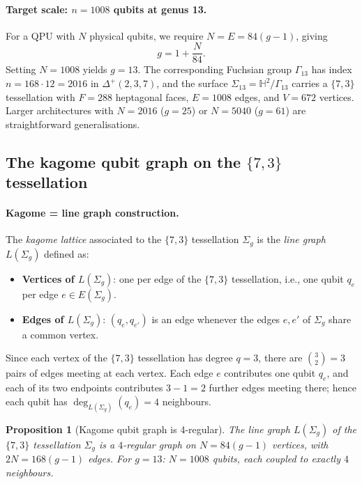 \documentclass[11pt,oneside]{amsbook}
\numberwithin{equation}{section}
\theoremstyle{plain}
\newtheorem{proposition}[theorem]{Proposition}
\theoremstyle{definition}
\theoremstyle{remark}
\begin{document}
\paragraph{Target scale: $n=1008$ qubits at genus 13.}
For a QPU with $N$ physical qubits, we require
$N = E = 84(g-1)$, giving
\[
  g = 1 + \frac{N}{84}.
\]
Setting $N = 1008$ yields $g = 13$.  The corresponding Fuchsian group
$\Gamma_{13}$ has index $n = 168\cdot 12 = 2016$ in $\Delta^+(2,3,7)$,
and the surface $\Sigma_{13} = \mathbb{H}^2/\Gamma_{13}$ carries a $\{7,3\}$
tessellation with $F = 288$ heptagonal faces, $E = 1008$ edges, and
$V = 672$ vertices.  Larger architectures with $N = 2016$ ($g=25$) or
$N = 5040$ ($g=61$) are straightforward generalisations.

\subsection{The kagome qubit graph on the $\{7,3\}$ tessellation}
\label{subsec:hk_qubitgraph}

\paragraph{Kagome = line graph construction.}
The \emph{kagome lattice} associated to the $\{7,3\}$ tessellation
$\Sigma_g$ is the \emph{line graph} $L(\Sigma_g)$ defined as:
\begin{itemize}
\item \textbf{Vertices of $L(\Sigma_g)$}: one per edge of the $\{7,3\}$
  tessellation, i.e., one qubit $q_e$ per edge $e\in E(\Sigma_g)$.
\item \textbf{Edges of $L(\Sigma_g)$}: $(q_e,q_{e'})$ is an edge whenever
  the edges $e,e'$ of $\Sigma_g$ share a common vertex.
\end{itemize}
Since each vertex of the $\{7,3\}$ tessellation has degree $q=3$, there are
$\binom{3}{2}=3$ pairs of edges meeting at each vertex.  Each edge $e$
contributes one qubit $q_e$, and each of its two endpoints contributes
$3-1=2$ further edges meeting there; hence each qubit has
$\deg_{L(\Sigma_g)}(q_e) = 4$ neighbours.

\begin{proposition}[Kagome qubit graph is 4-regular]
\label{prop:kagome_4regular}
The line graph $L(\Sigma_g)$ of the $\{7,3\}$ tessellation $\Sigma_g$ is a
$4$-regular graph on $N = 84(g-1)$ vertices, with $2N = 168(g-1)$ edges.
For $g=13$: $N = 1008$ qubits, each coupled to exactly $4$ neighbours.
\end{proposition}
\end{document}
